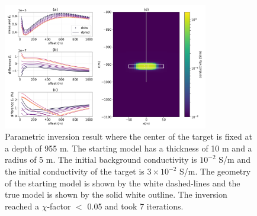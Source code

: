 \begin{figure}
    \begin{center}
    \includegraphics[width=0.8\textwidth]{figures/inversion/parametric_voxel2_dz10_fixedz0.png}
    \end{center}
\caption{
    Parametric inversion result where the center of the target is fixed at a depth
    of 955 m. The starting model has a thickness of 10 m and a radius of 5 m. The initial background
    conductivity is $10^{-2}$ S/m and the initial conductivity of the target is $3\times10^{-2}$ S/m.
    The geometry of the starting model is shown by the white dashed-lines and the
    true model is shown by the solid white outline. The inversion reached a $\chi$-factor $<$ 0.05
    and took 7 iterations.
}
\label{fig:parametric_voxel2_dz10_fixedz0}
\end{figure}
